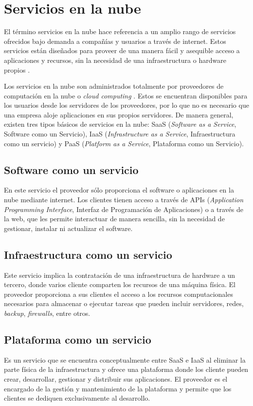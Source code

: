 \section{Servicios en la nube}
El término servicios en la nube hace referencia a un amplio rango de servicios ofrecidos bajo demanda a compañías y usuarios a través de internet. Estos servicios están diseñados para proveer de una manera fácil y asequible acceso a aplicaciones y recursos, sin la necesidad de una infraestructura o hardware propios \cite{cs_def}.

Los servicios en la nube son administrados totalmente por proveedores de computación en la nube o \textit{cloud computing} \cite{cs_def}. Estos se encuentran disponibles para los usuarios desde los servidores de los proveedores, por lo que no es necesario que una empresa aloje aplicaciones en sus propios servidores. De manera general, existen tres tipos básicos de servicios en la nube: SaaS (\textit{Software as a Service}, Software como un Servicio), IaaS (\textit{Infrastructure as a Service}, Infraestructura como un servicio) y PaaS (\textit{Platform as a Service}, Plataforma como un Servicio).

\subsection{Software como un servicio}
En este servicio el proveedor sólo proporciona el software o aplicaciones en la nube mediante internet. Los clientes tienen acceso a través de APIs (\textit{Application Programming Interface}, Interfaz de Programación de Aplicaciones) o a través de la web, que les permite interactuar de manera sencilla, sin la necesidad de gestionar, instalar ni actualizar el software.

\subsection{Infraestructura como un servicio}
Este servicio implica la contratación de una infraestructura de hardware a un tercero, donde varios cliente comparten los recursos de una máquina física. El proveedor proporciona a sus clientes el acceso a los recursos computacionales necesarios para almacenar o ejecutar tareas que pueden incluir servidores, redes, \textit{backup}, \textit{firewalls}, entre otros.

\subsection{Plataforma como un servicio}
Es un servicio que se encuentra conceptualmente entre SaaS e IaaS al eliminar la parte física de la infraestructura y ofrece una plataforma donde los cliente pueden crear, desarrollar, gestionar y distribuir sus aplicaciones. El proveedor es el encargado de la gestión y mantenimiento de la plataforma y permite que los clientes se dediquen exclusivamente al desarrollo.

